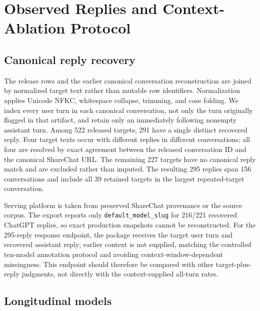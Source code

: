 \documentclass{article}
\begin{document}
\section{Observed Replies and Context-Ablation Protocol}
\label{app:observed-replies}

\subsection{Canonical reply recovery}

The release rows and the earlier canonical conversation reconstruction are joined by normalized target text rather than mutable row identifiers. Normalization applies Unicode NFKC, whitespace collapse, trimming, and case folding. We index every user turn in each canonical conversation, not only the turn originally flagged in that artifact, and retain only an immediately following nonempty assistant turn. Among 522 released targets, 291 have a single distinct recovered reply. Four target texts occur with different replies in different conversations; all four are resolved by exact agreement between the released conversation ID and the canonical ShareChat URL. The remaining 227 targets have no canonical reply match and are excluded rather than imputed. The resulting 295 replies span 156 conversations and include all 39 retained targets in the largest repeated-target conversation.

Serving platform is taken from preserved ShareChat provenance or the source corpus. The export reports only \texttt{default\_model\_slug} for 216/221 recovered ChatGPT replies, so exact production snapshots cannot be reconstructed. For the 295-reply response endpoint, the package receives the target user turn and recovered assistant reply; earlier context is not supplied, matching the controlled ten-model annotation protocol and avoiding context-window-dependent missingness. This endpoint should therefore be compared with other target-plus-reply judgments, not directly with the context-supplied all-turn rates.

\subsection{Longitudinal models}
\end{document}
